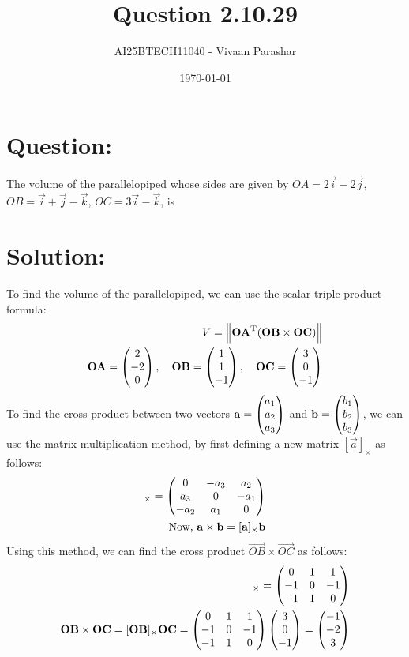 \documentclass[a4paper, 12pt]{article}
\title{Question 2.10.29}
\author{AI25BTECH11040 - Vivaan Parashar}
\date{\today}
\begin{document}
\maketitle

\section{Question: }
The volume of the parallelopiped whose sides are given by $\textit{OA} = 2\vec{i}-2\vec{j}$, $\textit{OB} = \vec{i}+\vec{j}-\vec{k}$, $\textit{OC} = 3\vec{i} - \vec{k}$, is

\section{Solution: }
To find the volume of the parallelopiped, we can use the scalar triple product formula:
\begin{align}
    V = \left\lVert\mathbf{OA}^{\mathrm{T}}(\mathbf{OB} \times \mathbf{OC})\right\rVert \\
    \mathbf{OA} = \begin{pmatrix}2 \\ -2 \\ 0\end{pmatrix}, \quad
    \mathbf{OB} = \begin{pmatrix}1 \\ 1 \\ -1\end{pmatrix}, \quad
    \mathbf{OC} = \begin{pmatrix}3 \\ 0 \\ -1\end{pmatrix}\\
\end{align}
To find the cross product between two vectors $\mathbf{a} = \begin{pmatrix}a_1 \\ a_2 \\ a_3\end{pmatrix}$ and $\mathbf{b} = \begin{pmatrix}b_1 \\ b_2 \\ b_3\end{pmatrix}$, we can use the matrix multiplication method, by first defining a new matrix $[\vec{a}]_{\times}$ as follows:
\begin{align}
    [\vec{a}]_{\times} = \myvec{0 & -a_3 & a_2 \\ a_3 & 0 & -a_1 \\ -a_2 & a_1 & 0} \\
    \text{Now, }\vec{a} \times \vec{b} = [\vec{a}]_{\times}\vec{b}
\end{align}
Using this method, we can find the cross product $\vec{OB} \times \vec{OC}$ as follows:
\begin{align}
    [\vec{OB}]_{\times} = \myvec{0 & 1 & 1 \\ -1 & 0 & -1 \\ -1 & 1 & 0} \\
    \vec{OB} \times \vec{OC} = [\vec{OB}]_{\times}\vec{OC} = \myvec{0 & 1 & 1 \\ -1 & 0 & -1 \\ -1 & 1 & 0}\myvec{3 \\ 0 \\ -1} = \myvec{-1 \\ -2 \\ 3}
\end{align}
\end{document}
